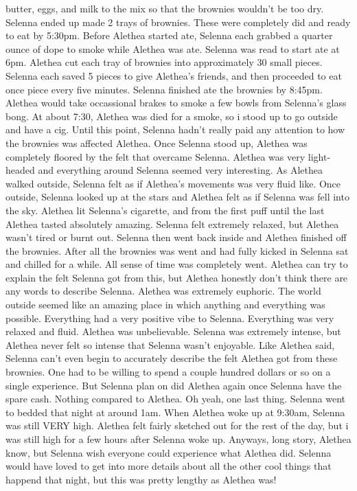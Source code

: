 \documentclass[12pt]{book}
\begin{document}
butter, eggs, and milk to the mix so that the brownies wouldn't be too dry. Selenna ended up made 2 trays of brownies. These were completely did and ready to eat by 5:30pm. Before Alethea started ate, Selenna each grabbed a quarter ounce of dope to smoke while Alethea was ate. Selenna was read to start ate at 6pm. Alethea cut each tray of brownies into approximately 30 small pieces. Selenna each saved 5 pieces to give Alethea's friends, and then proceeded to eat once piece every five minutes. Selenna finished ate the brownies by 8:45pm. Alethea would take occassional brakes to smoke a few bowls from Selenna's glass bong. At about 7:30, Alethea was died for a smoke, so i stood up to go outside and have a cig. Until this point, Selenna hadn't really paid any attention to how the brownies was affected Alethea. Once Selenna stood up, Alethea was completely floored by the felt that overcame Selenna. Alethea was very light-headed and everything around Selenna seemed very interesting. As Alethea walked outside, Selenna felt as if Alethea's movements was very fluid like. Once outside, Selenna looked up at the stars and Alethea felt as if Selenna was fell into the sky. Alethea lit Selenna's cigarette, and from the first puff until the last Alethea tasted absolutely amazing. Selenna felt extremely relaxed, but Alethea wasn't tired or burnt out. Selenna then went back inside and Alethea finished off the brownies. After all the brownies was went and had fully kicked in Selenna sat and chilled for a while. All sense of time was completely went. Alethea can try to explain the felt Selenna got from this, but Alethea honestly don't think there are any words to describe Selenna. Alethea was extremely euphoric. The world outside seemed like an amazing place in which anything and everything was possible. Everything had a very positive vibe to Selenna. Everything was very relaxed and fluid. Alethea was unbelievable. Selenna was extremely intense, but Alethea never felt so intense that Selenna wasn't enjoyable. Like Alethea said, Selenna can't even begin to accurately describe the felt Alethea got from these brownies. One had to be willing to spend a couple hundred dollars or so on a single experience. But Selenna plan on did Alethea again once Selenna have the spare cash. Nothing compared to Alethea. Oh yeah, one last thing. Selenna went to bedded that night at around 1am. When Alethea woke up at 9:30am, Selenna was still VERY high. Alethea felt fairly sketched out for the rest of the day, but i was still high for a few hours after Selenna woke up. Anyways, long story, Alethea know, but Selenna wish everyone could experience what Alethea did. Selenna would have loved to get into more details about all the other cool things that happend that night, but this was pretty lengthy as Alethea was!
\end{document}
